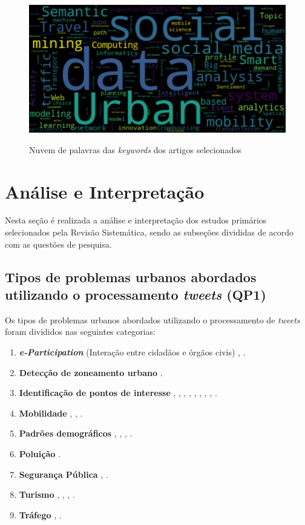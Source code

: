 \documentclass[
	12pt,				%
	oneside,			%
	a4paper,			%
	english,			%
	brazil				%
	]{abntex2ppgsi}
\begin{document}
\begin{figure}[H]%
	\centering
 	  \caption{Nuvem de palavras das \textit{keywords} dos artigos selecionados}
		\includegraphics[width=0.8\linewidth]{images/world_cloud_metodologia.png}
	\label{fig:w_cloud}
\end{figure}

\section{Análise e Interpretação}
\label{analise}
Nesta seção é realizada a análise e interpretação dos estudos primários selecionados pela Revisão Sistemática, sendo as subseções divididas de acordo com as questões de pesquisa.
\subsection{Tipos de problemas urbanos abordados utilizando o processamento \textit{tweets} (QP1)}

Os tipos de problemas urbanos abordados utilizando o processamento de \textit{tweets} foram divididos nas seguintes categorias: 

\begin{enumerate}
\item \textit{\textbf{e-Participation}} (Interação entre  cidadãos  e órgãos civis) \cite{Mukherjee2015}, \cite{Soomro2016}.
\item \textbf{Detecção de zoneamento urbano} \cite{Frias-Martinez2014}.
\item \textbf{Identificação de pontos de interesse} \cite{Farseev2015}, \cite{Gutev2016}, \cite{Bendler2014}, \cite{Abbasi2015}, \cite{Gkiotsalitis2015}, \cite{Gkiotsalitis2016}, \cite{Hasan2014}, \cite{Maghrebi2015}, \cite{DiLorenzo2013}.
\item \textbf{Mobilidade} \cite{Gutev2016}, \cite{Chen2016}, \cite{Yousaf2014}.
\item \textbf{Padrões demográficos} \cite{Farseev2015}, \cite{Gutev2016}, \cite{Steiger2015Census}, \cite{Guo2016}.
\item \textbf{Poluição} \cite{Zagal2016}.
\item \textbf{Segurança Pública} \cite{Wen2016}, \cite{Mata2015}.
\item \textbf{Turismo} \cite{Thomaz2016}, \cite{Abbasi2015}, \cite{Chua2016}, \cite{Sobolevsky2015}.
\item \textbf{Tráfego} \cite{Anantharam2015}, \cite{Lecue2014}.
\end{enumerate}
\end{document}
